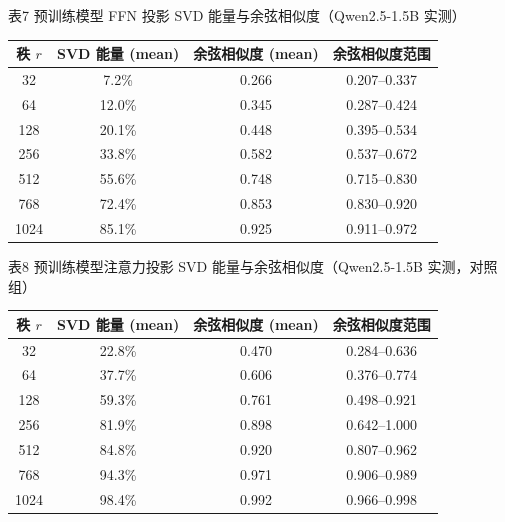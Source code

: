 \documentclass[UTF8,a4paper,12pt]{ctexart}
\newcommand{\cmtablecaption}[1]{%
  {\centering\fangsong\fontsize{10.5pt}{16pt}\selectfont #1\par}%
}
\begin{document}
\begin{center}
\cmtablecaption{表7 预训练模型 FFN 投影 SVD 能量与余弦相似度（Qwen2.5-1.5B 实测）}
\vspace{4pt}
\begin{tabular}{cccc}
\hline
秩 $r$ & SVD 能量 (mean) & 余弦相似度 (mean) & 余弦相似度范围 \\
\hline
32   & 7.2\%  & 0.266 & 0.207--0.337 \\
64   & 12.0\% & 0.345 & 0.287--0.424 \\
128  & 20.1\% & 0.448 & 0.395--0.534 \\
256  & 33.8\% & 0.582 & 0.537--0.672 \\
512  & 55.6\% & 0.748 & 0.715--0.830 \\
768  & 72.4\% & 0.853 & 0.830--0.920 \\
1024 & 85.1\% & 0.925 & 0.911--0.972 \\
\hline
\end{tabular}
\end{center}
\begin{center}
\cmtablecaption{表8 预训练模型注意力投影 SVD 能量与余弦相似度（Qwen2.5-1.5B 实测，对照组）}
\vspace{4pt}
\begin{tabular}{cccc}
\hline
秩 $r$ & SVD 能量 (mean) & 余弦相似度 (mean) & 余弦相似度范围 \\
\hline
32   & 22.8\% & 0.470 & 0.284--0.636 \\
64   & 37.7\% & 0.606 & 0.376--0.774 \\
128  & 59.3\% & 0.761 & 0.498--0.921 \\
256  & 81.9\% & 0.898 & 0.642--1.000 \\
512  & 84.8\% & 0.920 & 0.807--0.962 \\
768  & 94.3\% & 0.971 & 0.906--0.989 \\
1024 & 98.4\% & 0.992 & 0.966--0.998 \\
\hline
\end{tabular}
\end{center}
\end{document}
